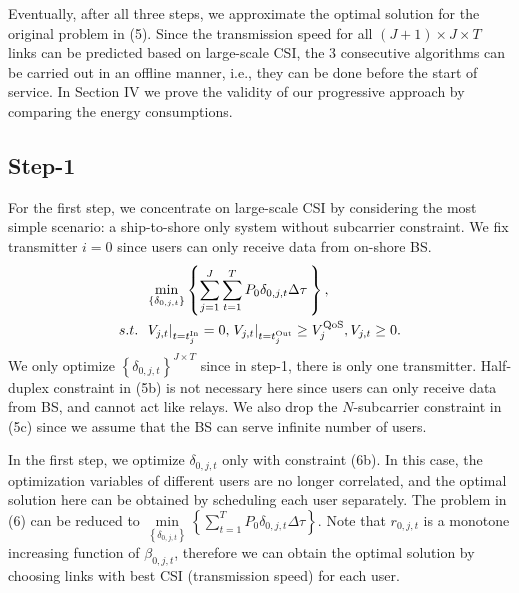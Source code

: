 \documentclass[conference]{IEEEtran}
\begin{document}
 Eventually, after all three steps, we approximate the optimal solution for the original problem in (5). Since the transmission speed for all $\left( J+1 \right) \times J \times T$ links can be predicted based on large-scale CSI, the 3 consecutive algorithms can be carried out in an offline manner, i.e., they can be done before the start of service. In Section IV we prove the validity of our progressive approach by comparing the energy consumptions. 
 
 \subsection{Step-1}
 
 For the first step, we concentrate on large-scale CSI by considering the most simple scenario: a ship-to-shore only system without subcarrier constraint. We fix transmitter $i = 0$ since users can only receive data from on-shore BS. 
 \begin{subequations}
 \begin{align}
 & \mathop {\min }\limits_{\left\{ {{\delta _{0,j,t}}} \right\}} \left\{ {\sum\limits_{j = 1}^J {\sum\limits_{t = 1}^{T} {{P_{0}}\delta _{0,j,t} \Delta \tau } \,} } \right\} ,\\
  {s.t.} \;\; &{{{\left. {{V_{j,t}}} \right|}_{t = t_j^{{\rm{In}}}}} = 0,\left. { {V_{j,t}}} \right|_{t = t_j^{{\rm{Out}}}}} \ge V_j^{\rm{QoS}}, {V_{j,t}} \ge 0.
 \end{align}
 \end{subequations}
 We only optimize $\left\{ {{\delta _{0,j,t}}} \right\}^{J \times T}$ since in step-1, there is only one transmitter. 
 Half-duplex constraint in (5b) is not necessary here since users can only receive data from BS, and cannot act like relays. We also drop the $N$-subcarrier constraint in (5c) since we assume that the BS can serve infinite number of users. 
 
 In the first step, we optimize ${\delta _{0,j,t}}$ only with constraint (6b). In this case, the optimization variables of different users are no longer correlated, and the optimal solution here can be obtained by scheduling each user separately. The problem in (6) can be reduced to $\mathop {\min }\limits_{{\left\{ {{\delta _{0,j,t}}} \right\}}} \left\{ {\sum\limits_{t = 1}^T {{P_{0}}\delta _{0,j,t} \Delta \tau } } \right\}$. Note that ${r_{0,j,t}}$ is a monotone increasing function of ${\beta _{0,j,t}}$, therefore we can obtain the optimal solution by choosing links with best CSI (transmission speed) for each user. 
 
\end{document}
